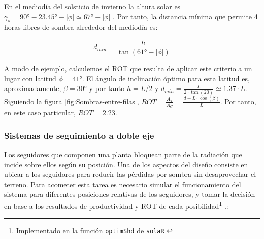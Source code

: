 En el mediodía del solsticio de invierno la altura solar es
$\gamma_{s}=\ang{90} - \ang{23.45}-|\phi|\simeq \ang{67}-|\phi|$
.
Por tanto, la distancia mínima que permite 4 horas libres de sombra
alrededor del mediodía es:

\begin{equation}
d_{min}=\frac{h}{\tan(\ang{61}-|\phi|)}
\end{equation}

A modo de ejemplo, calculemos el ROT que resulta de aplicar este
criterio a un lugar con latitud $\phi=\ang{41}$. El ángulo de inclinación
óptimo para esta latitud es, aproximadamente, $\beta=\ang{30}$ y por
tanto $h=L/2$ y $d_{min}=\frac{L}{2 \cdot \tan(20)} \simeq 1.37 \cdot
L$. Siguiendo la figura \ref{fig:Sombras-entre-filas},
$ROT=\frac{A_T}{A_G}=\frac{d+L \cdot \cos(\beta)}{L}$. Por tanto, en
este caso particular, $ROT=2.23$.


\subsubsection{Sistemas de seguimiento a doble eje}

Los seguidores que componen una planta bloquean parte de la radiación
que incide sobre ellos según su posición. Una de los aspectos del
diseño consiste en ubicar a los seguidores para reducir las pérdidas
por sombra sin desaprovechar el terreno. Para acometer esta tarea
es necesario simular el funcionamiento del sistema para diferentes
posiciones relativas de los seguidores, y tomar la decisión en base
a los resultados de productividad y ROT de cada
posibilidad\footnote{Implementado en la función \href{http://search.r-project.org/R/library/solaR/html/optimShd.html}{\texttt{optimShd}} de
  \texttt{solaR} \cite{Perpinan2012b}} \cite{Perpinan2008}.:

